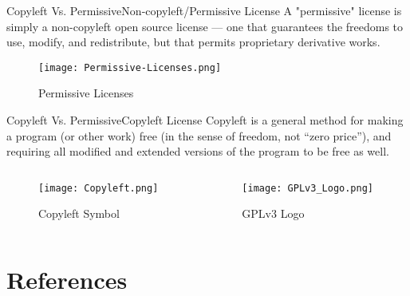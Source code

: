 \documentclass{beamer}
\begin{document}
    \begin{frame}{Copyleft Vs. Permissive}{Non-copyleft/Permissive License}
        A "permissive" license is simply a non-copyleft open source license —
        one that guarantees the freedoms to use, modify, and redistribute, but that permits proprietary derivative works.\cite{OSIWEBSITE:5}

        \begin{figure}
            \centering
            \texttt{[image: Permissive-Licenses.png]}
            \caption{Permissive Licenses\cite{permissive-licensesExpamles}}
        \end{figure}
    \end{frame}

    \begin{frame}{Copyleft Vs. Permissive}{Copyleft License}
        Copyleft is a general method for making a program (or other work) free (in the sense of freedom, not “zero price”),
        and requiring all modified and extended versions of the program to be free as well.\cite{GNUDOTORG:5}

        \begin{columns}
            \begin{column}{0.5\textwidth}
                \begin{figure}
                    \centering
                    \texttt{[image: Copyleft.png]}
                    \caption{Copyleft Symbol\cite{copyleftsymbol}}
                \end{figure}
            \end{column}
            \begin{column}{0.5\textwidth}
                \begin{figure}
                    \centering
                    \texttt{[image: GPLv3\_Logo.png]}
                    \caption{GPLv3 Logo\cite{gplLogo}}
                \end{figure}
            \end{column}
        \end{columns}
    \end{frame}
    \section*{References}
    
    
\end{document}
